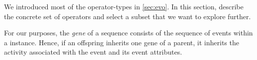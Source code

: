 \documentclass[./../../paper.tex]{subfiles}
\begin{document}





We introduced most of the operator-types in \autoref{sec:evo}.
In this section, describe the concrete set of operators and select a subset that we want to explore further.

For our purposes, the \emph{gene} of a sequence consists of the sequence of events within a \gls{instance}. Hence, if an offspring inherits one gene of a parent, it inherits the activity associated with the event and its event attributes.
\end{document}
